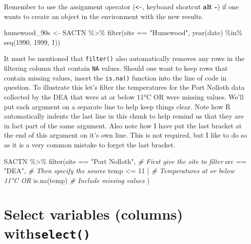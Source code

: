 \documentclass[
]{book}
\newenvironment{Shaded}{\begin{snugshade}}{\end{snugshade}}
\newcommand{\CommentTok}[1]{\textcolor[rgb]{0.56,0.35,0.01}{\textit{#1}}}
\newcommand{\DecValTok}[1]{\textcolor[rgb]{0.00,0.00,0.81}{#1}}
\newcommand{\FunctionTok}[1]{\textcolor[rgb]{0.00,0.00,0.00}{#1}}
\newcommand{\NormalTok}[1]{#1}
\newcommand{\OtherTok}[1]{\textcolor[rgb]{0.56,0.35,0.01}{#1}}
\newcommand{\SpecialCharTok}[1]{\textcolor[rgb]{0.00,0.00,0.00}{#1}}
\newcommand{\StringTok}[1]{\textcolor[rgb]{0.31,0.60,0.02}{#1}}
\begin{document}
Remember to use the assignment operator (\texttt{\textless{}-}, keyboard shortcut \textbf{alt -}) if one wants to create an object in the environment with the new results.

\begin{Shaded}
\begin{Highlighting}[]
\NormalTok{humewood\_90s }\OtherTok{\textless{}{-}}\NormalTok{ SACTN }\SpecialCharTok{\%\textgreater{}\%} 
  \FunctionTok{filter}\NormalTok{(site }\SpecialCharTok{==} \StringTok{"Humewood"}\NormalTok{, }\FunctionTok{year}\NormalTok{(date) }\SpecialCharTok{\%in\%} \FunctionTok{seq}\NormalTok{(}\DecValTok{1990}\NormalTok{, }\DecValTok{1999}\NormalTok{, }\DecValTok{1}\NormalTok{))}
\end{Highlighting}
\end{Shaded}

It must be mentioned that \texttt{filter()} also automatically removes any rows in the filtering column that contain \texttt{NA} values. Should one want to keep rows that contain missing values, insert the \texttt{is.na()} function into the line of code in question. To illustrate this let's filter the temperatures for the Port Nolloth data collected by the DEA that were at or below 11°C OR were missing values. We'll put each argument on a separate line to help keep things clear. Note how R automatically indents the last line in this chunk to help remind us that they are in fact part of the same argument. Also note how I have put the last bracket at the end of this argument on it's own line. This is not required, but I like to do so as it is a very common mistake to forget the last bracket.

\begin{Shaded}
\begin{Highlighting}[]
\NormalTok{SACTN }\SpecialCharTok{\%\textgreater{}\%} 
  \FunctionTok{filter}\NormalTok{(site }\SpecialCharTok{==} \StringTok{"Port Nolloth"}\NormalTok{, }\CommentTok{\# First give the site to filter}
\NormalTok{         src }\SpecialCharTok{==} \StringTok{"DEA"}\NormalTok{, }\CommentTok{\# Then specify the source}
\NormalTok{         temp }\SpecialCharTok{\textless{}=} \DecValTok{11} \SpecialCharTok{|} \CommentTok{\# Temperatures at or below 11°C OR}
           \FunctionTok{is.na}\NormalTok{(temp) }\CommentTok{\# Include missing values}
\NormalTok{         )}
\end{Highlighting}
\end{Shaded}

\hypertarget{select-variables-columns-withselect}{%
\section{\texorpdfstring{Select variables (columns) with\texttt{select()}}{Select variables (columns) withselect()}}\label{select-variables-columns-withselect}}
\end{document}
